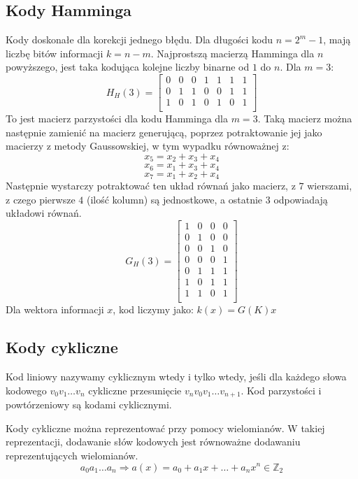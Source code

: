 \documentclass{../notatki}
\begin{document}
\subsection{Kody Hamminga}

Kody doskonałe dla korekcji jednego błędu.
Dla długości kodu $n = 2^m - 1$, mają liczbę bitów informacji $k = n - m$.
Najprostszą macierzą Hamminga dla $n$ powyższego, jest taka kodująca kolejne
liczby binarne od $1$ do $n$. Dla $m = 3$:
$$
H_H(3) =
\begin{bmatrix}
0 & 0 & 0 & 1 & 1 & 1 & 1 \\
0 & 1 & 1 & 0 & 0 & 1 & 1 \\
1 & 0 & 1 & 0 & 1 & 0 & 1 \\
\end{bmatrix}
$$
To jest macierz parzystości dla kodu Hamminga dla $m = 3$.
Taką macierz można następnie zamienić na macierz generującą, poprzez
potraktowanie jej jako macierzy z metody Gaussowskiej, w tym wypadku równoważnej
z:
$$
x_5 = x_2 + x_3 + x_4
$$
$$
x_6 = x_1 + x_3 + x_4
$$
$$
x_7 = x_1 + x_2 + x_4
$$
Następnie wystarczy potraktować ten układ równań jako macierz, z $7$ wierszami,
z czego pierwsze $4$ (ilość kolumn) są jednostkowe, a ostatnie $3$ odpowiadają
układowi równań.
$$
G_H(3) =
\begin{bmatrix}
1 & 0 & 0 & 0 \\
0 & 1 & 0 & 0 \\
0 & 0 & 1 & 0 \\
0 & 0 & 0 & 1 \\
0 & 1 & 1 & 1 \\
1 & 0 & 1 & 1 \\
1 & 1 & 0 & 1 \\
\end{bmatrix}
$$
Dla wektora informacji $x$, kod liczymy jako: $k(x) = G(K)x$

\subsection{Kody cykliczne}

Kod liniowy nazywamy cyklicznym wtedy i tylko wtedy, jeśli dla każdego słowa
kodowego $v_0v_1 \dots v_n$ cykliczne przesunięcie $v_{n}v_0v_1\dots v_{n + 1}$.
Kod parzystości i powtórzeniowy są kodami cyklicznymi.

Kody cykliczne można reprezentować przy pomocy wielomianów. W takiej
reprezentacji, dodawanie słów kodowych jest równoważne dodawaniu
reprezentujących wielomianów.
$$
a_0a_1\dots a_n \Rightarrow a(x) = a_0 + a_1x + \dots + a_nx^n \in \mathbb{Z}_2
$$
\end{document}
